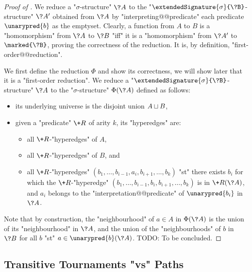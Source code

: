 \begin{proof}[Proof of ]
We reduce a "$\sigma$-structure" $\?A$ to the
"$\extendedSignature{\sigma}{\?B}$-structure" $\?A'$ obtained
from $\?A$ by "interpreting@@predicate" each predicate $\unarypred{b}$ as the emptyset.
Clearly, a function from $A$ to $B$ is a "homomorphism" from $\?A$ to $\?B$
"iff" it is a "homomorphism" from $\?A'$ to $\marked{\?B}$, proving the correctness
of the reduction. It is, by definition, "first-order@@reduction".

We first define the reduction $\Phi$ and show its correctness, we will show later that it
is a "first-order reduction". We reduce a "$\extendedSignature{\sigma}{\?B}$-structure" $\?A$ to the "$\sigma$-structure"
$\Phi(\?A)$ defined as follows:
\begin{itemize}
	\item its underlying universe is the disjoint union $A \sqcup B$,
	\item given a "predicate" $\+R$ of arity $k$, its "hyperedges" are:
	\begin{itemize}
	\item all $\+R$-"hyperedges" of $A$,
	\item all $\+R$-"hyperedges" of $B$, and
	\item all $\+R$-"hyperedges" $(b_1,\hdots,b_{i-1}, a_i, b_{i+1},\hdots,b_k)$
		"st" there exists $b_i$ for which the $\+R$-"hyperedge"
		$(b_1,\hdots,b_{i-1}, b_i, b_{i+1},\hdots,b_k)$
		is in $\+R(\?A)$, and $a_i$ belongs to the "interpretation@@predicate" of 
		$\unarypred{b_i}$ in $\?A$.
	\end{itemize}
\end{itemize}
Note that by construction, the "neighbourhood" of $a \in A$ in $\Phi(\?A)$ is
the union of its "neighbourhood" in $\?A$, and the union of the "neighbourhoods" of
$b$ in $\?B$ for all $b$ "st" $a \in \unarypred{b}(\?A)$.
TODO: To be concluded.  
\end{proof}

\subsection{Transitive Tournaments "vs" Paths}

